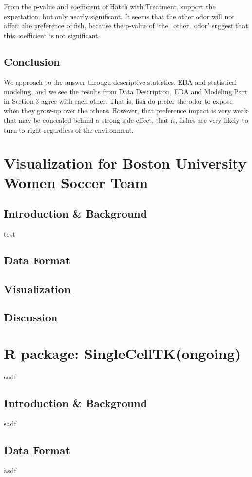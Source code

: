\documentclass{article}
\begin{document}
	From the p-value and coefficient of Hatch with Treatment, support the expectation, but only nearly significant. It seems that the other odor will not affect the preference of fish, because the p-value of ‘the\_other\_odor’ suggest that this coefficient is not significant.
	
	\subsection{Conclusion}
	We approach to the answer through descriptive statistics, EDA and statistical modeling, and we see the results from Data Description, EDA and Modeling Part in Section 3 agree with each other. That is, fish do prefer the odor to expose when they grow-up over the others. However, that preference impact is very weak that may be concealed behind a strong side-effect, that is, fishes are very likely to turn to right regardless of the environment.


	\section{Visualization for Boston University Women Soccer Team}
	\subsection{Introduction \& Background}
	test
	\subsection{Data Format}
	\subsection{Visualization}
	\subsection{Discussion}	
	
	\section{R package: SingleCellTK(ongoing)}
	asdf
	\subsection{Introduction \& Background}
	sadf
	\subsection{Data Format}
	asdf
\end{document}
